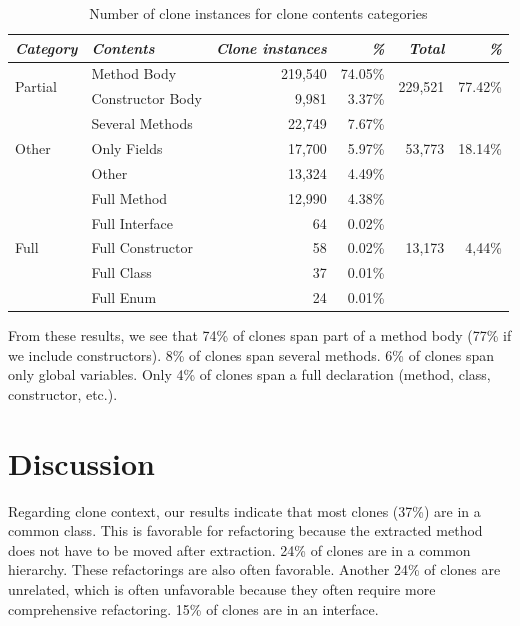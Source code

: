 \documentclass[runningheads]{llncs}
\begin{document}
\begin{table}[H]
\centering
\begin{tabular}{@{}l|l|rr|rr@{}}
\toprule
\textit{\textbf{Category}} & \textit{\textbf{Contents}} & \textit{\textbf{Clone instances}} & \textit{\textbf{\%}} & \textit{\textbf{Total}} & \textit{\textbf{\%}} \\ \midrule
\multirow{2}{*}{Partial} & Method Body & 219,540 & 74.05\% & \multirow{2}{*}{229,521}& \multirow{2}{*}{77.42\%} \\ \cmidrule(lr){2-4}
 & Constructor Body & 9,981 & 3.37\% & & \\ \midrule
\multirow{3}{*}{Other} & Several Methods & 22,749 & 7.67\% & \multirow{3}{*}{53,773} & \multirow{3}{*}{18.14\%} \\ \cmidrule(lr){2-4}
 & Only Fields & 17,700 & 5.97\% & & \\ \cmidrule(lr){2-4}
 & Other & 13,324 & 4.49\% & & \\ \midrule
 \multirow{5}{*}{Full} & Full Method & 12,990 & 4.38\% & \multirow{5}{*}{13,173}& \multirow{5}{*}{4,44\%} \\ \cmidrule(lr){2-4}
  & Full Interface & 64 & 0.02\% & & \\ \cmidrule(lr){2-4}
  & Full Constructor & 58 & 0.02\% & & \\ \cmidrule(lr){2-4}
  & Full Class & 37 & 0.01\% & & \\ \cmidrule(lr){2-4}
  & Full Enum & 24 & 0.01\% & & \\ \bottomrule
\end{tabular}
\caption{Number of clone instances for clone contents categories}
\label{tab:contents}
\end{table}

From these results, we see that 74\% of clones span part of a method body (77\% if we include constructors). 8\% of clones span several methods. 6\% of clones span only global variables. Only 4\% of clones span a full declaration (method, class, constructor, etc.).

\section{Discussion}
Regarding clone context, our results indicate that most clones (37\%) are in a common class. This is favorable for refactoring because the extracted method does not have to be moved after extraction. 24\% of clones are in a common hierarchy. These refactorings are also often favorable. Another 24\% of clones are unrelated, which is often unfavorable because they often require more comprehensive refactoring. 15\% of clones are in an interface.
\end{document}
